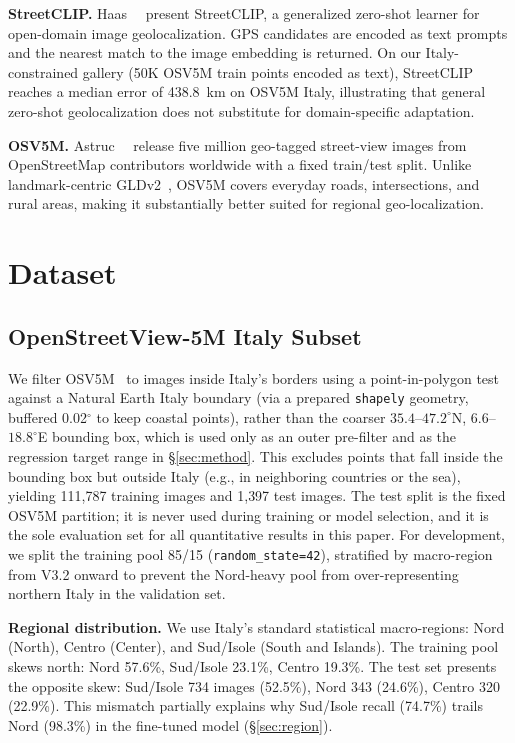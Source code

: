 \documentclass[10pt,twocolumn,letterpaper]{article}
\begin{document}
\noindent\textbf{StreetCLIP.}
Haas~\etal~\cite{streetclip} present StreetCLIP, a generalized zero-shot
learner for open-domain image geolocalization.
GPS candidates are encoded as text prompts and the nearest match to the image
embedding is returned.
On our Italy-constrained gallery (50K OSV5M train points encoded as text),
StreetCLIP reaches a median error of 438.8~km on OSV5M Italy, illustrating
that general zero-shot geolocalization does not substitute for domain-specific
adaptation.

\noindent\textbf{OSV5M.}
Astruc~\etal~\cite{osv5m} release five million geo-tagged street-view images
from OpenStreetMap contributors worldwide with a fixed train/test split.
Unlike landmark-centric GLDv2~\cite{gldv2}, OSV5M covers everyday roads,
intersections, and rural areas, making it substantially better suited for
regional geo-localization.

\section{Dataset}

\subsection{OpenStreetView-5M Italy Subset}
\label{sec:polygon}

We filter OSV5M~\cite{osv5m} to images inside Italy's borders using a
point-in-polygon test against a Natural Earth Italy boundary (via a prepared
\texttt{shapely} geometry, buffered 0.02$^\circ$ to keep coastal points), rather
than the coarser $35.4$--$47.2^\circ$N, $6.6$--$18.8^\circ$E bounding box, which
is used only as an outer pre-filter and as the regression target range in
\S\ref{sec:method}. This excludes points that fall inside the bounding box but
outside Italy (e.g., in neighboring countries or the sea), yielding 111{,}787
training images and 1{,}397 test images.
The test split is the fixed OSV5M partition; it is never used during training
or model selection, and it is the sole evaluation set for all quantitative
results in this paper.
For development, we split the training pool 85/15 (\texttt{random\_state=42}),
stratified by macro-region from V3.2 onward to prevent the Nord-heavy pool from
over-representing northern Italy in the validation set.

\noindent\textbf{Regional distribution.}
We use Italy's standard statistical macro-regions: Nord (North), Centro
(Center), and Sud/Isole (South and Islands).
The training pool skews north: Nord 57.6\%, Sud/Isole 23.1\%, Centro 19.3\%.
The test set presents the opposite skew: Sud/Isole 734 images (52.5\%), Nord 343
(24.6\%), Centro 320 (22.9\%).
This mismatch partially explains why Sud/Isole recall (74.7\%) trails Nord
(98.3\%) in the fine-tuned model (\S\ref{sec:region}).
\end{document}
